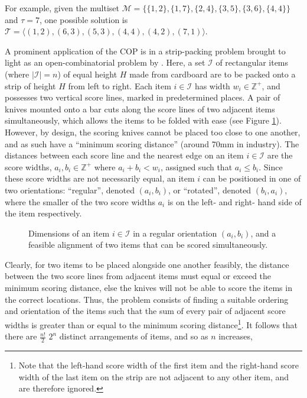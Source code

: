 \documentclass[oribibl]{llncs}
\begin{document}
For example, given the multiset $\mathcal{M} = \{\{1,2\}, \{1,7\}, \{2,4\}, \{3,5\}, \{3,6\}, \{4,4\}\}$ and $\tau = 7$, one possible solution is $\mathcal{T} = \langle(1,2), (6,3), (5,3), (4,4), (4,2), (7,1) \rangle$.

A prominent application of the COP is in a strip-packing problem brought to light as an open-combinatorial problem by \cite{goulimis2004}. Here, a set $\mathcal{I}$ of rectangular items (where $|\mathcal{I}| = n$) of equal height $H$ made from cardboard are to be packed onto a strip of height $H$ from left to right. Each item $i \in \mathcal{I}$ has width $w_i \in \mathbb{Z}^{+}$, and possesses two vertical score lines, marked in predetermined places. A pair of knives mounted onto a bar cuts along the score lines of two adjacent items simultaneously, which allows the items to be folded with ease (see Figure \ref{fig:itemsknife}). However, by design, the scoring knives cannot be placed too close to one another, and as such have a ``minimum scoring distance'' (around 70mm in industry). The distances between each score line and the nearest edge on an item $i \in \mathcal{I}$ are the score widths, $a_i, b_i \in \mathbb{Z}^{+}$ where $a_i + b_i < w_i$, assigned such that $a_i \leq b_i$. Since these score widths are not necessarily equal, an item $i$ can be positioned in one of two orientations: ``regular'', denoted $(a_i, b_i)$, or ``rotated'', denoted $(b_i, a_i)$, where the smaller of the two score widths $a_i$ is on the left- and right- hand side of the item respectively. 
\begin{figure}[H]	
	\centering
	
	\caption{Dimensions of an item $i \in \mathcal{I}$ in a regular orientation $(a_i, b_i)$, and a feasible alignment of two items that can be scored simultaneously.}	
	\label{fig:itemsknife}
\end{figure}

Clearly, for two items to be placed alongside one another feasibly, the distance between the two score lines from adjacent items must equal or exceed the minimum scoring distance, else the knives will not be able to score the items in the correct locations. Thus, the problem consists of finding a suitable ordering and orientation of the items such that the sum of every pair of adjacent score widths is greater than or equal to the minimum scoring distance\footnote{Note that the left-hand score width of the first item and the right-hand score width of the last item on the strip are not adjacent to any other item, and are therefore ignored.}. It follows that there are $\frac{n!}{2}$ $2^n$ distinct arrangements of items, and so as $n$ increases,
\end{document}

